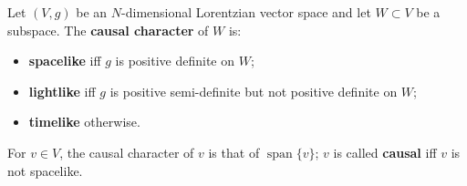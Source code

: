 Let $(V, g)$ be an $N$-dimensional Lorentzian vector space and let $W \subset V$ be a subspace. The \textbf{causal character} of $W$ is:
\begin{itemize}
\item[(a)] \textbf{spacelike} iff $g$ is positive definite on $W$;
\item[(b)] \textbf{lightlike} iff $g$ is positive semi-definite but not positive definite on $W$;
\item[(c)] \textbf{timelike} otherwise.
\end{itemize}
For $v \in V$, the causal character of $v$ is that of $\operatorname{span}\{v\}$; $v$ is called \textbf{causal} iff $v$ is not spacelike.
